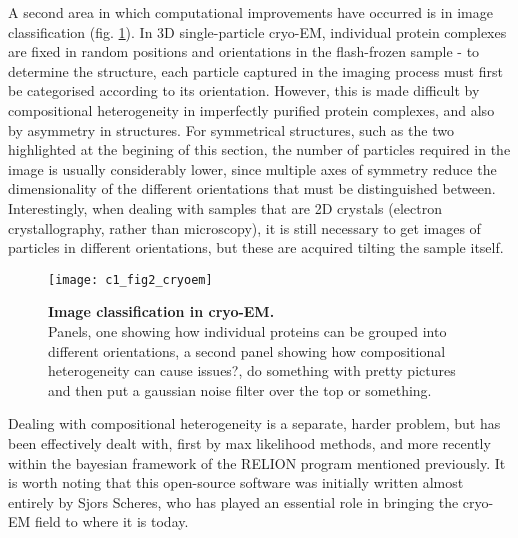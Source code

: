 \documentclass[a4paper,11pt,twoside,openright]{scrbook}
\begin{document}
A second area in which computational improvements have occurred is in image classification (fig. \ref{c1fig2}). In 3D single-particle cryo-EM, individual protein complexes are fixed in random positions and orientations in the flash-frozen sample - to determine the structure, each particle captured in the imaging process must first be categorised according to its orientation. However, this is made difficult by compositional heterogeneity in imperfectly purified protein complexes, and also by asymmetry in structures. For symmetrical structures, such as the two highlighted at the begining of this section, the number of particles required in the image is usually considerably lower, since multiple axes of symmetry reduce the dimensionality of the different orientations that must be distinguished between. Interestingly, when dealing with samples that are 2D crystals (electron crystallography, rather than microscopy), it is still necessary to get images of particles in different orientations, but these are acquired tilting the sample itself.

\begin{figure}[h]
    \texttt{[image: c1\_fig2\_cryoem]}
    \caption[Image classification in cryo-EM]{\sffamily \textbf{Image classification in cryo-EM.} \\  Panels, one showing how individual proteins can be grouped into different orientations, a second panel showing how compositional heterogeneity can cause issues?, do something with pretty pictures and then put a gaussian noise filter over the top or something.}
    \label{c1fig2}
\end{figure}


Dealing with compositional heterogeneity is a separate, harder problem, but has been effectively dealt with, first by max likelihood methods, and more recently within the bayesian framework of the RELION program mentioned previously. It is worth noting that this open-source software was initially written almost entirely by Sjors Scheres, who has played an essential role in bringing the cryo-EM field to where it is today.

\clearpage
\end{document}
